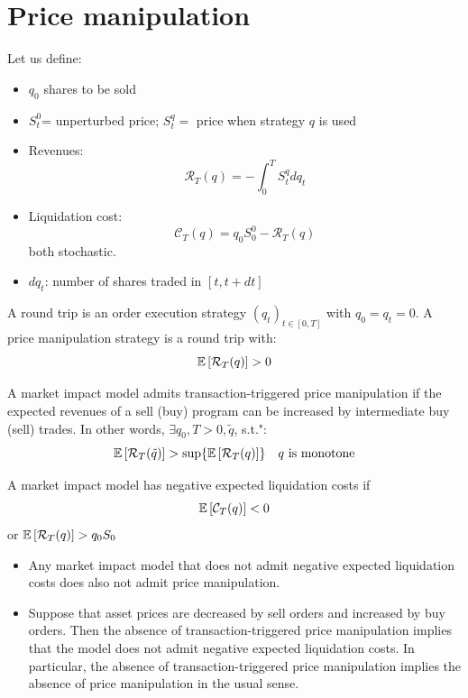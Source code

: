\section{Price manipulation}
Let us define:
\begin{itemize}
	\item $q_0$ shares to be sold
	\item $S_t^0$= unperturbed price; $S_t^q =$ price when strategy $q$ is used
	\item Revenues:
	\[
	\mathcal{R}_T(q) = -\int_0^T S_t^qdq_t
	\]
	\item Liquidation cost:
	\[
	\mathcal{C}_T(q) = q_0S_0^0 - \mathcal{R}_T(q)
	\]
both stochastic.
\item $dq_t$: number of shares traded in $[t,t+dt]$
\end{itemize}
\begin{mydefinition}
	A round trip is an order execution strategy $(q_t)_{t \in [0,T]}$ with $q_0 =q_t =0$. A price manipulation strategy is a round trip with:
	\[
\mathbb{E}\left[\mathcal{R}_T(q)\right]>0	
	\]
\end{mydefinition}
\begin{mydefinition}
	A market impact model admits transaction-triggered price manipulation if the expected revenues of a sell (buy) program can be increased by intermediate buy (sell) trades. In other words, $\exists q_0,T>0,\tilde{q}$, s.t.":
	\[
	\mathbb{E}\left[\mathcal{R}_T(\tilde{q})\right] > \sup \{\mathbb{E}\left[\mathcal{R}_T(q)\right]\}\quad q \text{ is monotone}
	\]
\end{mydefinition}
\begin{mydefinition}
	A market impact model has negative expected liquidation costs if
	\[
	\mathbb{E}\left[\mathcal{C}_T (q)\right] <0
	\]
or $\mathbb{E}\left[\mathcal{R}_T (q)\right] > q_0S_0$
\end{mydefinition}
\begin{mytheorem}
	\begin{itemize}
		\item Any market impact model that does not admit negative expected liquidation costs does also not admit price manipulation.
		\item Suppose that asset prices are decreased by sell orders and increased by buy orders.
		Then the absence of transaction-triggered price manipulation implies that the model
		does not admit negative expected liquidation costs. In particular, the absence of
		transaction-triggered price manipulation implies the absence of price manipulation in
		the usual sense.
	\end{itemize}
\end{mytheorem}
